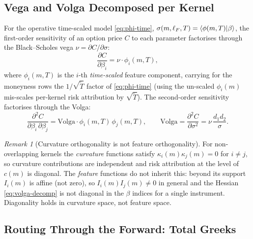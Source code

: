 \documentclass[11pt]{book}
\theoremstyle{plain}
\theoremstyle{definition}
\theoremstyle{remark}
\newtheorem{remark}[theorem]{Remark}
\newcommand{\braket}[1]{\mathinner{\langle #1 \rangle}}
\newcommand{\mln}{m}                             %
\newcommand{\lF}{\ell_F}                         %
\newcommand{\vega}{\nu}                          %
\newcommand{\Volga}{\mathrm{Volga}}
\begin{document}
\subsection{Vega and Volga Decomposed per Kernel}
\label{sec:vega-decomp}

For the operative time-scaled model \eqref{eq:phi-time},
$\sigma(\mln,\lF,T) = \braket{\phi(\mln,T)|\beta}$, the first-order
sensitivity of an option price $C$ to each parameter factorises through the
Black--Scholes vega $\vega = \partial C/\partial\sigma$:
\begin{equation}\label{eq:vega-decomp}
\frac{\partial C}{\partial\beta_i} = \vega\cdot\phi_i(\mln,T),
\end{equation}
where $\phi_i(\mln,T)$ is the $i$-th \emph{time-scaled} feature component,
carrying for the moneyness rows the $1/\sqrt{\tilde T}$ factor of
\eqref{eq:phi-time} (using the un-scaled $\phi_i(\mln)$ mis-scales per-kernel
risk attribution by $\sqrt{\tilde T}$). The second-order sensitivity factorises
through the Volga:
\begin{equation}\label{eq:volga-decomp}
\frac{\partial^2 C}{\partial\beta_i\,\partial\beta_j}
= \Volga\cdot\phi_i(\mln,T)\,\phi_j(\mln,T),
\qquad
\Volga = \frac{\partial^2 C}{\partial\sigma^2}
= \vega\,\frac{d_1 d_2}{\sigma}.
\end{equation}

\begin{remark}[Curvature orthogonality is not feature orthogonality]
\label{rem:orthogonality}
For non-overlapping kernels the \emph{curvature} functions satisfy
$\kappa_i(\mln)\kappa_j(\mln) = 0$ for $i\neq j$, so curvature contributions are
independent and risk attribution at the level of $c(\mln)$ is diagonal. The
\emph{feature} functions do not inherit this: beyond its support $I_i(\mln)$ is
affine (not zero), so $I_i(\mln) I_j(\mln) \neq 0$ in general and the Hessian
\eqref{eq:volga-decomp} is not diagonal in the $\beta$ indices for a single
instrument. Diagonality holds in curvature space, not feature space.
\end{remark}

\subsection{Routing Through the Forward: Total Greeks}
\label{sec:total-greeks}
\end{document}

